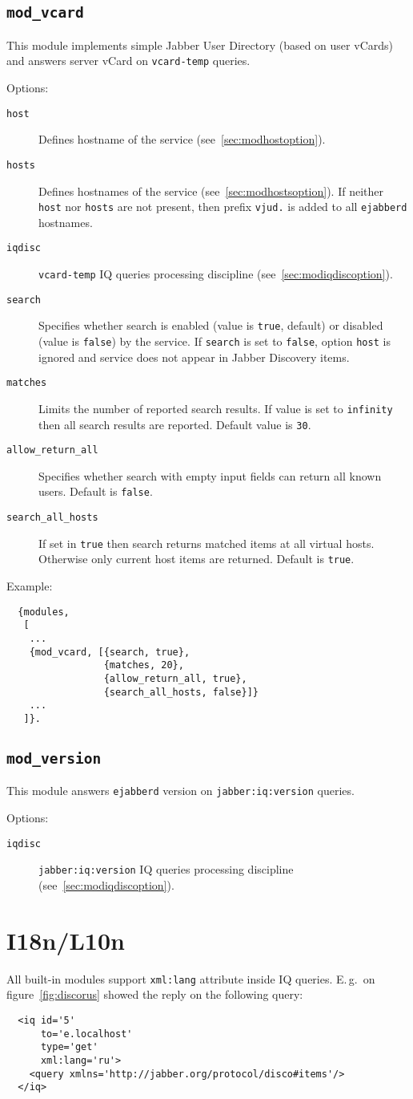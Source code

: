\documentclass[a4paper,10pt]{article}
\newcommand{\bracehack}{\def\{{\char"7B}\def\}{\char"7D}}
\newcommand{\ns}[1]{\texttt{#1}}
\newcommand{\jid}[1]{\texttt{#1}}
\newcommand{\term}[1]{\texttt{#1}}
\newcommand{\ejabberd}{\texttt{ejabberd}}
\newcommand{\module}[1]{\texttt{#1}}
\newcommand{\modvcard}{\module{mod\_vcard}}
\newcommand{\modversion}{\module{mod\_version}}
\newcommand{\titem}[1]{\item[\bracehack\texttt{#1}]}
\newcommand{\iqdiscitem}[1]{\titem{iqdisc} #1 IQ queries processing
discipline (see~\ref{sec:modiqdiscoption}).}
\newcommand{\hostitem}[1]{
  \titem{host} Defines hostname of the service
  (see~\ref{sec:modhostoption}).
  \titem{hosts} Defines hostnames of the service
  (see~\ref{sec:modhostsoption}).  If neither \texttt{host} nor \texttt{hosts}
  are not present, then prefix \jid{#1.} is added to all \ejabberd{} hostnames.
}
\begin{document}
\subsection{\modvcard{}}
\label{sec:modvcard}

This module implements simple Jabber User Directory (based on user vCards)
and answers server vCard on \ns{vcard-temp} queries.

Options:
\begin{description}
\hostitem{vjud}
\iqdiscitem{\ns{vcard-temp}}
\titem{search} Specifies whether search is enabled (value is \term{true}, default) or
disabled (value is \term{false}) by the service. If \term{search} is set to \term{false},
option \term{host} is ignored and service does not appear in Jabber Discovery items.
\titem{matches} Limits the number of reported search results. If value is set to
\term{infinity} then all search results are reported.  Default value is \term{30}.
\titem{allow\_return\_all}  Specifies whether search with empty input fields can
return all known users.  Default is \term{false}.
\titem{search\_all\_hosts}  If set in \term{true} then search returns matched
items at all virtual hosts.  Otherwise only current host items are returned.
Default is \term{true}.
\end{description}

Example:
\begin{verbatim}
  {modules,
   [
    ...
    {mod_vcard, [{search, true},
                 {matches, 20},
                 {allow_return_all, true},
                 {search_all_hosts, false}]}
    ...
   ]}.
\end{verbatim}


\subsection{\modversion{}}
\label{sec:modversion}

This module answers \ejabberd{} version on \ns{jabber:iq:version} queries.

Options:
\begin{description}
\iqdiscitem{\ns{jabber:iq:version}}
\end{description}


\section{I18n/L10n}
\label{sec:i18nl10n}

All built-in modules support \texttt{xml:lang} attribute inside IQ queries.
E.\,g.\ on figure~\ref{fig:discorus} showed the reply on the following query:
\begin{verbatim}
  <iq id='5'
      to='e.localhost'
      type='get'
      xml:lang='ru'>
    <query xmlns='http://jabber.org/protocol/disco#items'/>
  </iq>
\end{verbatim}
\end{document}
